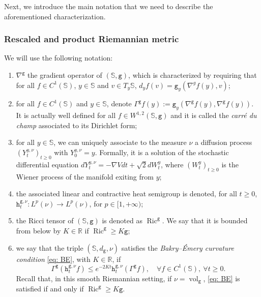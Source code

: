 \documentclass[10pt,leqno]{amsart}
\numberwithin{equation}{section}
\newcommand{\R}{\mathbb{R}}
\newcommand{\ttg}{\mathtt{g}}
\newcommand{\Ss}{\mathbb{S}}
\begin{document}
Next, we introduce the main notation that we need to describe the aforementioned characterization. 

\subsubsection{Rescaled and product Riemannian metric} We will use the following notation:
\begin{enumerate}
    \item $\nabla^{\mathtt{g}}$ the gradient operator of $(\Ss,\mathtt{g})$, which is characterized by requiring that for all $f\in C^{1}(\Ss)$, $y\in \Ss$ and $v\in T_y\Ss$, $d_yf(v) = \mathtt{g}_y(\nabla^g f(y), v)$;
    \item for all $f\in C^1(\Ss)$ and $y\in \Ss$, denote $\Gamma^{\mathtt{g}}f(y) := \mathtt{g}_y(\nabla^\mathtt{g} f(y), \nabla^\mathtt{g} f(y))$. It is actually well defined for all $f\in W^{1,2}(\Ss,\mathtt{g})$ and it is called the \textit{carr\'e du champ} associated to its Dirichlet form;
    \item for all $y\in \Ss$, we can uniquely associate to the measure $\nu$ a diffusion process $(Y_t^{y,\nu})_{t\geq 0}$ with $Y_0^{y,\nu} = y$. Formally, it is a solution of the stochastic differential equation $dY_t^{y,\nu} = -\nabla V dt + \sqrt{2}dW_t^{y}$, where $(W_t^y)_{t\geq 0}$ is the Wiener process of the manifold exiting from $y$;
    \item the associated linear and contractive heat semigroup is denoted, for all $t\geq 0$, $\mathtt{h}_t^{\mathtt{g},\nu}:L^p(\nu) \to L^p(\nu)$, for $p\in[1,+\infty)$;
    \item the Ricci tensor of $(\Ss,\ttg)$ is denoted as $\operatorname{Ric}^{\mathtt{g}}$. We say that it is bounded from below by $K \in \R$ if $\operatorname{Ric}^{\mathtt{g}} \geq K \mathtt{g}$;
    \item we say that the triple $(\Ss,d_\ttg, \nu)$ satisfies the \textit{Bakry--\'Emery curvature condition} \ref{eq: BE}, with $K\in \R$, if
    \begin{equation}
        \Gamma^{\mathtt{g}}(\mathtt{h}^{\mathtt{g},\nu}_t f) \leq e^{-2Kt} \mathtt{h}^{\mathtt{g},\nu}_t(\Gamma^\mathtt{g}f), \quad \forall f\in C^1(\Ss), \ \forall t\geq 0.
    \end{equation} 
    Recall that, in this smooth Riemannian setting, if $\nu= \operatorname{vol}_\ttg$, \ref{eq: BE} is satisfied if and only if $\operatorname{Ric}^\ttg \geq K \ttg$.
\end{enumerate}
\end{document}
